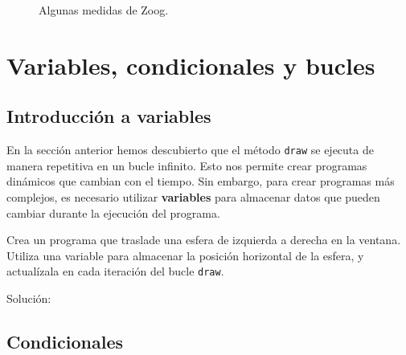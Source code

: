 \documentclass[
  spanish,
  11pt,
  a4paper,
  DIV=11,
  numbers=noendperiod]{scrartcl}
\begin{document}
\begin{figure}

\caption{\label{fig-zoog-follow-mouse}Algunas medidas de Zoog.}

\end{figure}%

\section{Variables, condicionales y bucles}

\label{variables-condicionales-y-bucles}

\subsection{Introducción a variables}

\label{introducción-a-variables}

En la sección anterior hemos descubierto que el método \texttt{draw} se ejecuta de manera repetitiva en un bucle infinito. Esto nos permite crear programas dinámicos que cambian con el tiempo. Sin embargo, para crear programas más complejos, es necesario utilizar \textbf{variables} para almacenar datos que pueden cambiar durante la ejecución del programa.

\begin{tcolorbox}[enhanced jigsaw, toprule=.15mm, coltitle=black, titlerule=0mm, opacitybacktitle=0.6, breakable, colback=white, colframe=quarto-callout-note-color-frame, colbacktitle=quarto-callout-note-color!10!white, opacityback=0, title={Ejercicio 14 - Traslada una esfera}, bottomtitle=1mm, rightrule=.15mm, toptitle=1mm, left=2mm, bottomrule=.15mm, leftrule=.75mm, arc=.35mm]

Crea un programa que traslade una esfera de izquierda a derecha en la ventana. Utiliza una variable para almacenar la posición horizontal de la esfera, y actualízala en cada iteración del bucle \texttt{draw}.

Solución:


\end{tcolorbox}

\subsection{Condicionales}
\end{document}
